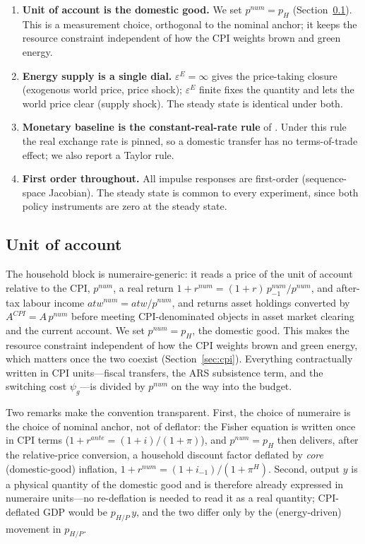 \documentclass[11pt,a4paper]{article}
\begin{document}
\begin{enumerate}
rebates it as domestic value added (Section~\ref{sec:bop}).
\item \textbf{Unit of account is the domestic good.} We set $p^{num}=p_H$
(Section~\ref{sec:num}). This is a measurement choice, orthogonal to the
nominal anchor; it keeps the resource constraint independent of how the CPI
weights brown and green energy.
\item \textbf{Energy supply is a single dial.} $\varepsilon^{E}=\infty$ gives
the price-taking closure (exogenous world price, price shock);
$\varepsilon^{E}$ finite fixes the quantity and lets the world price clear
(supply shock). The steady state is identical under both.
\item \textbf{Monetary baseline is the constant-real-rate rule} of
\citet{ARS2024}. Under this rule the real exchange rate is pinned, so a
domestic transfer has no terms-of-trade effect; we also report a Taylor rule.
\item \textbf{First order throughout.} All impulse responses are first-order
(sequence-space Jacobian). The steady state is common to every experiment,
since both policy instruments are zero at the steady state.
\end{enumerate}

\subsection{Unit of account}
\label{sec:num}

The household block is numeraire-generic: it reads a price of the unit of
account relative to the CPI, $p^{num}$, a real return
$1+r^{num}=(1+r)\,p^{num}_{-1}/p^{num}$, and after-tax labour income
$atw^{num}=atw/p^{num}$, and returns asset holdings converted by
$A^{CPI}=A\,p^{num}$ before meeting CPI-denominated objects in asset market
clearing and the current account. We set $p^{num}=p_{H}$, the domestic good.
This makes the resource constraint independent of how the CPI weights brown
and green energy, which matters once the two coexist (Section~\ref{sec:cpi}).
Everything contractually written in CPI units---fiscal transfers, the ARS
subsistence term, and the switching cost $\psi_g$---is divided by $p^{num}$
on the way into the budget.

Two remarks make the convention transparent. First, the choice of numeraire is
the choice of nominal anchor, not of deflator: the Fisher equation is written
once in CPI terms ($1+r^{ante}=(1+i)/(1+\pi)$), and $p^{num}=p_H$ then delivers,
after the relative-price conversion, a household discount factor deflated by
\emph{core} (domestic-good) inflation, $1+r^{num}=(1+i_{-1})/(1+\pi^H)$.
Second, output $y$ is a physical quantity of the domestic good and is therefore
already expressed in numeraire units---no re-deflation is needed to read it as a
real quantity; CPI-deflated GDP would be $p_{H/P}\,y$, and the two differ only
by the (energy-driven) movement in $p_{H/P}$.
\end{document}

